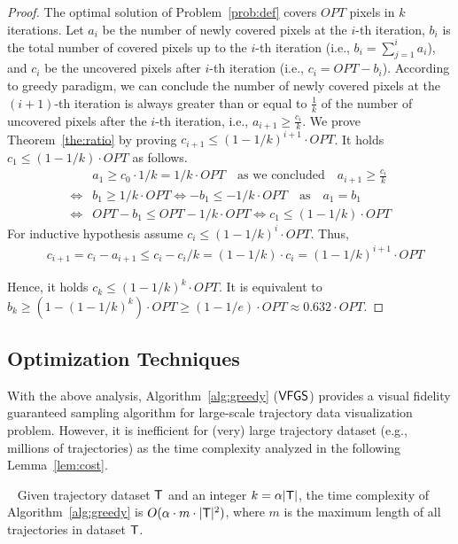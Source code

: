\begin{proof}
The optimal solution of Problem~\ref{prob:def} covers $OPT$ pixels in $k$ iterations.
Let $a_i$ be the number of newly covered pixels at the $i$-th iteration, $b_i$ is the total number of covered pixels up to the $i$-th iteration (i.e., $b_i = \sum_{j=1}^{i}a_i$),
and $c_i$ be the uncovered pixels after $i$-th iteration (i.e., $c_i = OPT-b_i$).
According to greedy paradigm, we can conclude the number of newly covered pixels at the $(i+1)$-th iteration is always greater than or equal to $\frac{1}{k}$ of the number of uncovered pixels after the $i$-th iteration, i.e., $a_{i+1} \geq \frac{c_i}{k}$.
We prove Theorem~\ref{the:ratio} by proving $c_{i+1} \leq (1-1/k)^{i+1} \cdot OPT$.
It holds $c_1 \leq (1-1/k) \cdot OPT$ as follows.
\begin{align} \nonumber
& a_1 \geq c_0 \cdot 1/k = 1/k \cdot OPT \text{~~~as we concluded~~~} a_{i+1} \geq \frac{c_i}{k}\\ \nonumber
 \Leftrightarrow  & b_1 \geq 1/k \cdot OPT  \Leftrightarrow  -b_1 \leq - 1/k \cdot OPT  \text{~~~as~~~} a_1 = b_1\\ \nonumber
 \Leftrightarrow & OPT - b_ 1 \leq OPT - 1/k \cdot OPT  \Leftrightarrow  c_1 \leq (1-1/k) \cdot OPT
\end{align}
For inductive hypothesis assume $c_{i} \leq (1-1/k)^i \cdot OPT$. Thus,
\begin{align} \nonumber
& c_{i+1} = c_i - a_{i+1} \leq c_i - c_i/k = (1-1/k) \cdot c_i = (1-1/k)^{i+1} \cdot OPT
\end{align}

Hence, it holds $c_k \leq (1-1/k)^{k} \cdot OPT$.
It is equivalent to $b_k \geq (1 - (1-1/k)^{k}) \cdot OPT \geq (1-1/e) \cdot OPT \approx 0.632 \cdot OPT$.
\end{proof}


\subsection{Optimization Techniques}\label{sec:opt}
With the above analysis, Algorithm~\ref{alg:greedy} ($\mathsf{VFGS}$) provides a visual fidelity guaranteed sampling algorithm for large-scale trajectory data visualization problem.
However, it is inefficient for (very) large trajectory dataset (e.g., millions of trajectories) as the time complexity analyzed in the following Lemma~\ref{lem:cost}.

\begin{lemma}~\label{lem:cost}
Given trajectory dataset $\mathsf{T}$ and an integer $k = \alpha |\mathsf{T}|$, the time complexity of Algorithm~\ref{alg:greedy} is $O(\alpha \cdot m \cdot |\mathsf{T}|^2)$, where $m$ is the maximum length of all trajectories in dataset $\mathsf{T}$.
\end{lemma}

